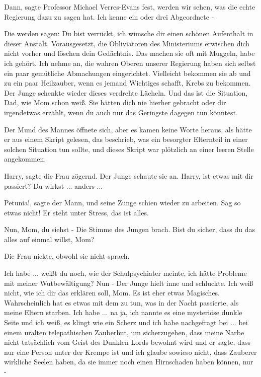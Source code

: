 \glqq{}Dann\grqq{}, sagte Professor Michael Verres-Evans fest, \glqq{}werden wir
sehen, was die echte Regierung dazu zu sagen hat. Ich kenne ein oder drei
Abgeordnete -\grqq{}

\glqq{}Die werden sagen: Du bist verrückt, ich wünsche dir einen schönen
Aufenthalt in dieser Anstalt. Vorausgesetzt, die Obliviatoren des Ministeriums
erwischen dich nicht vorher und löschen dein Gedächtnis. Das machen sie oft mit
Muggeln, habe ich gehört. Ich nehme an, die wahren Oberen unserer Regierung
haben sich selbst ein paar gemütliche Abmachungen eingerichtet. Vielleicht
bekommen sie ab und zu ein paar Heilzauber, wenn es jemand Wichtiges schafft,
Krebs zu bekommen.\grqq{} Der Junge schenkte wieder dieses verdrehte Lächeln.
\glqq{}Und das ist die Situation, Dad, wie Mom schon weiß. Sie hätten dich nie
hierher gebracht oder dir irgendetwas erzählt, wenn du auch nur das Geringste
dagegen tun könntest.\grqq{}

Der Mund des Mannes öffnete sich, aber es kamen keine Worte heraus, als hätte er
aus einem Skript gelesen, das beschrieb, was ein besorgter Elternteil in einer
solchen Situation tun sollte, und dieses Skript war plötzlich an einer leeren
Stelle angekommen.

\glqq{}Harry\grqq{}, sagte die Frau zögernd. Der Junge schaute sie an. \glqq{}
Harry, ist etwas mit dir passiert? Du wirkst ... anders ...\grqq{}

\glqq{}Petunia!\grqq{}, sagte der Mann, und seine Zunge schien wieder zu
arbeiten. \glqq{}Sag so etwas nicht! Er steht unter Stress, das ist alles.\grqq{}

\glqq{}Nun, Mom, du siehst -\grqq{} Die Stimme des Jungen brach. \glqq{}Bist du
sicher, dass du das alles auf einmal willst, Mom?\grqq{}

Die Frau nickte, obwohl sie nicht sprach.

\glqq{}Ich habe ... weißt du noch, wie der Schulpsychiater meinte, ich hätte
Probleme mit meiner Wutbewältigung? Nun -\grqq{} Der Junge hielt inne und
schluckte. \glqq{}Ich weiß nicht, wie ich dir das erklären soll, Mom. Es ist eher
etwas Magisches. Wahrscheinlich hat es etwas mit dem zu tun, was in der Nacht
passierte, als meine Eltern starben. Ich habe ... na ja, ich nannte es eine
mysteriöse dunkle Seite und ich weiß, es klingt wie ein Scherz und ich habe
nachgefragt bei ... bei einem uralten telepathischen Zauberhut, um sicherzugehen,
dass meine Narbe nicht tatsächlich vom Geist des Dunklen Lords bewohnt wird und
er sagte, dass nur eine Person unter der Krempe ist und ich glaube sowieso
nicht, dass Zauberer wirkliche Seelen haben, da sie immer noch einen Hirnschaden
haben können, nur -\grqq{}

